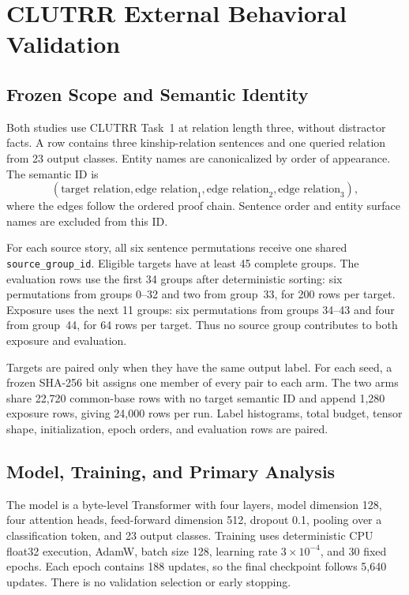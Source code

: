 \section{CLUTRR External Behavioral Validation}
\label{app:clutrr}

\subsection{Frozen Scope and Semantic Identity}

Both studies use CLUTRR Task~1 at relation length three, without distractor
facts.  A row contains three kinship-relation sentences and one queried
relation from 23 output classes.  Entity names are canonicalized by order of
appearance.  The semantic ID is
\[
(\text{target relation},
 \text{edge relation}_1,
 \text{edge relation}_2,
 \text{edge relation}_3),
\]
where the edges follow the ordered proof chain.  Sentence order and entity
surface names are excluded from this ID.

For each source story, all six sentence permutations receive one shared
\texttt{source\_group\_id}.  Eligible targets have at least 45 complete
groups.  The evaluation rows use the first 34 groups after deterministic
sorting: six permutations from groups 0--32 and two from group~33, for 200
rows per target.  Exposure uses the next 11 groups: six permutations from
groups 34--43 and four from group~44, for 64 rows per target.  Thus no source
group contributes to both exposure and evaluation.

Targets are paired only when they have the same output label.  For each seed,
a frozen SHA-256 bit assigns one member of every pair to each arm.  The two
arms share 22,720 common-base rows with no target semantic ID and append
1,280 exposure rows, giving 24,000 rows per run.  Label histograms, total
budget, tensor shape, initialization, epoch orders, and evaluation rows are
paired.

\subsection{Model, Training, and Primary Analysis}

The model is a byte-level Transformer with four layers, model dimension 128,
four attention heads, feed-forward dimension 512, dropout 0.1, pooling over a
classification token, and 23 output classes.  Training uses deterministic CPU
float32 execution, AdamW, batch size 128, learning rate
$3\times10^{-4}$, and 30 fixed epochs.  Each epoch contains 188 updates, so
the final checkpoint follows 5,640 updates.  There is no validation selection
or early stopping.

